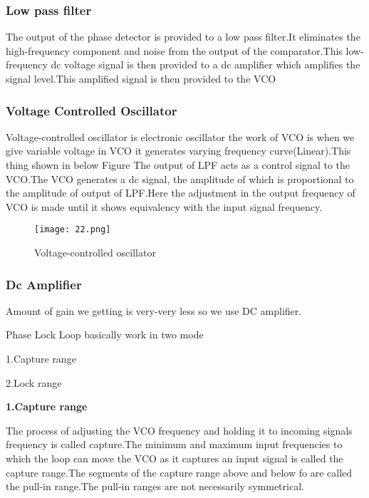 \documentclass{article}
\begin{document}
\subsubsection{Low pass filter}
The output of the phase detector is provided to a low pass filter.It eliminates the high-frequency component and noise from the output of the comparator.This low-frequency dc voltage signal is then provided to a dc  amplifier which amplifies the signal level.This amplified signal is then provided to the VCO

\subsubsection{Voltage Controlled Oscillator}
Voltage-controlled oscillator is electronic oscillator the work of VCO is when we give variable voltage in VCO it generates varying frequency curve(Linear).This thing shown in below Figure
The output of LPF acts as a control signal to the VCO.The VCO generates a dc signal, the amplitude of which is  proportional to the amplitude of output of LPF.Here the adjustment in the output frequency of VCO is made until it shows equivalency with the input signal frequency.

\begin{figure*}[h]
	\centering
	\texttt{[image: 22.png]}
	\caption{Voltage-controlled oscillator}
	\label{FBD}
\end{figure*}



\subsubsection{Dc Amplifier}
Amount of gain we getting is very-very less so we use DC amplifier.

Phase Lock Loop basically work in two mode \par
1.Capture range\par2.Lock range\par

\textbf{1.Capture range}\par
The process of adjusting the VCO frequency and holding it to incoming signals frequency is called capture.The minimum and maximum input frequencies to which the loop can move the VCO as it captures an input signal is called the capture range.The segments of the capture range above and below fo are called the pull-in range.The pull-in ranges are not necessarily symmetrical.\par
\par
\end{document}
